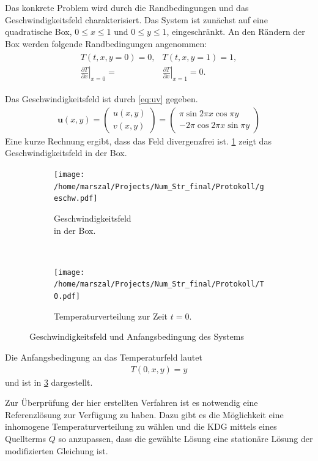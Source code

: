 Das konkrete Problem wird durch die Randbedingungen und das Geschwindigkeitsfeld charakterisiert.
Das System ist zunächst auf eine quadratische Box, $0\leq x \leq 1$ und $0\leq y \leq 1$, eingeschränkt.
An den Rändern der Box werden folgende Randbedingungen angenommen:
\begin{align}
  \begin{split}
  T(t,x,y=0) = 0, &  T(t,x,y=1)=1, \\
  \left.\frac{\partial T}{\partial x}\right|_{x=0} =& \left.\frac{\partial T}{\partial x}\right|_{x=1} = 0.
\end{split}
\end{align}

Das Geschwindigkeitsfeld ist durch \cref{eq:uv} gegeben.
\begin{align}
  \boldsymbol u(x,y) =
  \begin{pmatrix}
    u(x,y)\\
    v(x,y)
  \end{pmatrix} =
  \begin{pmatrix}
    \pi \sin{2\pi x}\cos{\pi y}\\
    -2\pi \cos{2\pi x}\sin{\pi y}
  \end{pmatrix}\label{eq:uv}
\end{align}
Eine kurze Rechnung ergibt, dass das Feld divergenzfrei ist. \cref{fig:uv} zeigt das Geschwindigkeitsfeld in der Box.
\begin{figure}
  \centering
  \begin{subfigure}[b]{0.45\textwidth}
  \texttt{[image: /home/marszal/Projects/Num\_Str\_final/Protokoll/geschw.pdf]}\caption{\centering Geschwindigkeitsfeld \\ in der Box.}\label{fig:uv}
  \end{subfigure}
  ~
  \begin{subfigure}[b]{0.45\textwidth}
  \texttt{[image: /home/marszal/Projects/Num\_Str\_final/Protokoll/T0.pdf]}\caption{\centering Temperaturverteilung zur Zeit $t=0$.}\label{fig:t0}
  \end{subfigure}
  \caption{Geschwindigkeitsfeld und Anfangsbedingung des Systems}
\end{figure}

Die Anfangsbedingung an das Temperaturfeld lautet
\begin{align}
  T(0,x,y) = y \nonumber
\end{align}
und ist in \cref{fig:t0} dargestellt.

Zur Überprüfung der hier erstellten Verfahren ist es notwendig eine Referenzlösung zur Verfügung zu haben.
Dazu gibt es die Möglichkeit eine inhomogene Temperaturverteilung zu wählen und die KDG mittels eines Quellterms $Q$ so anzupassen, dass die gewählte Lösung eine stationäre Lösung der modifizierten Gleichung ist.

